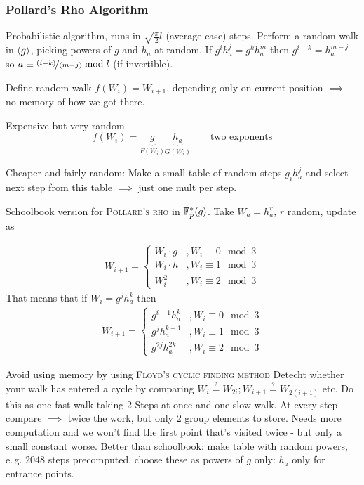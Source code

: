 \subsubsection{Pollard's Rho Algorithm}

Probabilistic algorithm, runs in $\sqrt{\frac{\pi}{2}l}$ (average case) steps. Perform a random walk in $\langle g \rangle$,  picking powers of $g$ and $h_a$ at random. If $g^i h_a^j = g^k h_a^m$ then $g^{i-k} = h_a^{m-j}$ so $a \equiv \nicefrac{(i-k)}{(m-j)} \bmod l$ (if invertible).

Define random walk $f(W_i) = W_{i+1}$, depending only on current position $\implies$ no memory of how we got there.

Expensive but very random
\[ f(W_i) = \underbrace{g}_{F(W_i)} \underbrace{h_a}_{G(W_i)} \qquad \text{two exponents} \]

Cheaper and fairly random: Make a small table of random steps $g_i h_a^j$ and select next step from this table $\implies$ just one mult per step.

Schoolbook version for \textsc{Pollard's rho} in $\mathbb{F}_p^{\ast} \langle g \rangle$. Take $W_a = h_a^r$, $r$ random, update as

\begin{align*}
W_{i+1}=\begin{cases}
  W_i\cdot g&, W_i\equiv0\mod 3 \\
  W_i\cdot h&, W_i\equiv1\mod 3\\
  W_i^2 &, W_i\equiv 2\mod 3
\end{cases}
\end{align*}
That means that if $W_i=g^j h_a^k$ then 
\begin{align*}
W_{i+1}=\begin{cases}
  g^{i+1}h_a^k  &, W_i\equiv0\mod 3 \\
  g^{j}h_a^{k+1}&, W_i\equiv1\mod 3\\
  g^{2j}h_a^{2k}&, W_i\equiv 2\mod 3
\end{cases}
\end{align*}

Avoid using memory by using \textsc{Floyd's cyclic finding method} Detecht whether your walk has entered a cycle by comparing $W_i \overset{?}{=} W_{2i}; W_{i+1} \overset{?}{=} W_{2(i+1)}$ etc. Do this as one fast walk taking 2 Steps at once and one slow walk. At every step compare $\implies$ twice the work, but only 2 group elements to store.
Needs more computation and we won't find the first point that's visited twice - but only a small constant worse. Better than schoolbook: make table with random powers, e.\,g. $2048$ steps precomputed, choose these as powers of $g$ only: $h_a$ only for entrance points.

